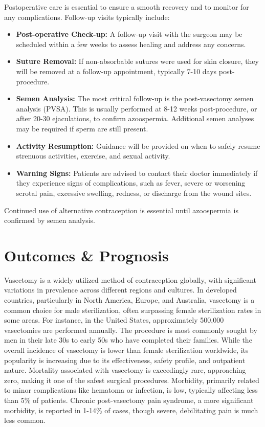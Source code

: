 Postoperative care is essential to ensure a smooth recovery and to monitor for any complications. Follow-up visits typically include:

\begin{itemize}
  \item \textbf{Post-operative Check-up:} A follow-up visit with the surgeon may be scheduled within a few weeks to assess healing and address any concerns.
  
  \item \textbf{Suture Removal:} If non-absorbable sutures were used for skin closure, they will be removed at a follow-up appointment, typically 7-10 days post-procedure.
  
  \item \textbf{Semen Analysis:} The most critical follow-up is the post-vasectomy semen analysis (PVSA). This is usually performed at 8-12 weeks post-procedure, or after 20-30 ejaculations, to confirm azoospermia. Additional semen analyses may be required if sperm are still present.
  
  \item \textbf{Activity Resumption:} Guidance will be provided on when to safely resume strenuous activities, exercise, and sexual activity.
  
  \item \textbf{Warning Signs:} Patients are advised to contact their doctor immediately if they experience signs of complications, such as fever, severe or worsening scrotal pain, excessive swelling, redness, or discharge from the wound sites.
\end{itemize}

Continued use of alternative contraception is essential until azoospermia is confirmed by semen analysis.

\section*{Outcomes \& Prognosis}
Vasectomy is a widely utilized method of contraception globally, with significant variations in prevalence across different regions and cultures. In developed countries, particularly in North America, Europe, and Australia, vasectomy is a common choice for male sterilization, often surpassing female sterilization rates in some areas. For instance, in the United States, approximately 500,000 vasectomies are performed annually. The procedure is most commonly sought by men in their late 30s to early 50s who have completed their families. While the overall incidence of vasectomy is lower than female sterilization worldwide, its popularity is increasing due to its effectiveness, safety profile, and outpatient nature. Mortality associated with vasectomy is exceedingly rare, approaching zero, making it one of the safest surgical procedures. Morbidity, primarily related to minor complications like hematoma or infection, is low, typically affecting less than 5\% of patients. Chronic post-vasectomy pain syndrome, a more significant morbidity, is reported in 1-14\% of cases, though severe, debilitating pain is much less common.

